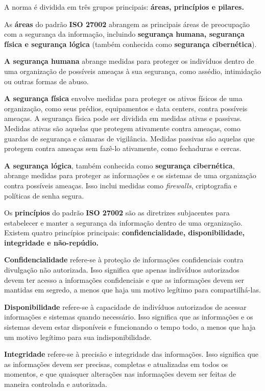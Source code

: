 A norma é dividida em três grupos principais: \textbf{áreas, princípios e pilares.}

As \textbf{áreas} do padrão \textbf{ISO 27002} abrangem as principais áreas de preocupação com a segurança da informação, incluindo \textbf{segurança humana, segurança física e segurança lógica} (também conhecida como \textbf{segurança cibernética}).

\textbf{A segurança humana} abrange medidas para proteger os indivíduos dentro de uma organização de possíveis ameaças à sua segurança, como assédio, intimidação ou outras formas de abuso.

\textbf{A segurança física} envolve medidas para proteger os ativos físicos de uma organização, como seus prédios, equipamentos e data centers, contra possíveis ameaças. A segurança física pode ser dividida em medidas ativas e passivas. Medidas ativas são aquelas que protegem ativamente contra ameaças, como guardas de segurança e câmaras de vigilância. Medidas passivas são aquelas que protegem contra ameaças sem fazê-lo ativamente, como fechaduras e cercas.

\textbf{A segurança lógica}, também conhecida como \textbf{segurança cibernética}, abrange medidas para proteger as informações e os sistemas de uma organização contra possíveis ameaças. Isso inclui medidas como \textit{firewalls}, criptografia e políticas de senha segura.

Os \textbf{princípios} do padrão \textbf{ISO 27002} são as diretrizes subjacentes para estabelecer e manter a segurança da informação dentro de uma organização. Existem quatro princípios principais: \textbf{confidencialidade, disponibilidade, integridade e não-repúdio.}

\textbf{Confidencialidade} refere-se à proteção de informações confidenciais contra divulgação não autorizada. Isso significa que apenas indivíduos autorizados devem ter acesso a informações confidenciais e que as informações devem ser mantidas em segredo, a menos que haja um motivo legítimo para compartilhá-las.

\textbf{Disponibilidade} refere-se à capacidade de indivíduos autorizados de acessar informações e sistemas quando necessário. Isso significa que as informações e os sistemas devem estar disponíveis e funcionando o tempo todo, a menos que haja um motivo legítimo para sua indisponibilidade.

\textbf{Integridade} refere-se à precisão e integridade das informações. Isso significa que as informações devem ser precisas, completas e atualizadas em todos os momentos, e que quaisquer alterações nas informações devem ser feitas de maneira controlada e autorizada.

